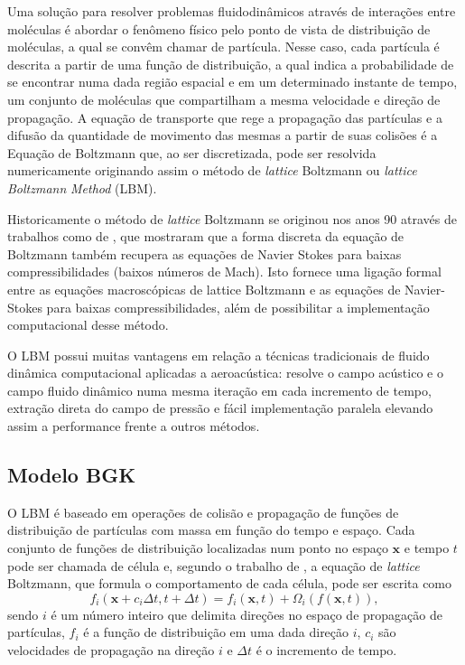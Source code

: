 Uma solução para resolver problemas fluidodinâmicos através de interações entre moléculas é abordar o fenômeno físico pelo ponto de vista de distribuição de moléculas, a qual se convêm chamar de partícula. Nesse caso, cada partícula é descrita a partir de uma função de distribuição, a qual indica a probabilidade de se encontrar numa dada região espacial e em um determinado instante de tempo, um conjunto de moléculas que compartilham a mesma velocidade e direção de propagação. A equação de transporte que rege a propagação das partículas e a difusão da quantidade de movimento das mesmas a partir de suas colisões é a Equação de Boltzmann que, ao ser discretizada, pode ser resolvida numericamente originando assim o método de \textit{lattice} Boltzmann ou \textit{lattice} \textit{Boltzmann} \textit{Method} (LBM). 

Historicamente o método de \textit{lattice} Boltzmann se originou nos anos 90 através de trabalhos como de , que mostraram que a forma discreta da equação de Boltzmann também recupera as equações de Navier Stokes para baixas compressibilidades (baixos números de Mach). Isto fornece uma ligação formal entre as equações macroscópicas de lattice Boltzmann e as equações de Navier-Stokes para baixas compressibilidades, além de possibilitar a implementação computacional desse método.

O LBM possui muitas vantagens em relação a técnicas tradicionais de fluido dinâmica computacional aplicadas a aeroacústica: resolve o campo acústico e o campo fluido dinâmico numa mesma iteração em cada incremento de tempo, extração direta do campo de pressão e fácil implementação paralela elevando assim a performance frente a outros métodos.

\subsection{Modelo BGK}

O LBM é baseado em operações de colisão e propagação de funções de distribuição de partículas com massa em função do tempo e espaço. Cada conjunto de funções de distribuição localizadas num ponto no espaço $\textbf{x}$ e tempo $t$ pode ser chamada de célula e, segundo o trabalho de , a equação de \textit{lattice} Boltzmann, que formula o comportamento de cada célula, pode ser escrita como 
\begin{equation}
	f_{i}(\textbf{x} + c_{i}\Delta t, t + \Delta t) = f_{i}(\textbf{x}, t) + \Omega_{i}(f(\textbf{x}, t)),
    \label{eq:f_i}
\end{equation}
sendo $i$ é um número inteiro que delimita direções no espaço de propagação de partículas, $f_{i}$ é a função de distribuição em uma dada direção $i$, $c_{i}$ são velocidades de propagação na direção $i$ e $\Delta t$ é o incremento de tempo. 

